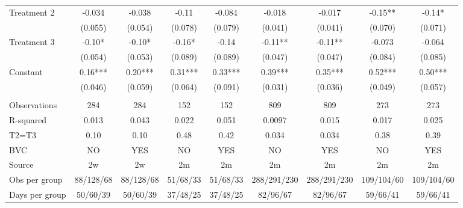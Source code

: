 \begin{tabular}{lcccccccc}
\midrule
\midrule
Treatment 2 & -0.034 & -0.038 & -0.11 & -0.084 & -0.018 & -0.017 & -0.15** & -0.14* \\
      & (0.055) & (0.054) & (0.078) & (0.079) & (0.041) & (0.041) & (0.070) & (0.071) \\
Treatment 3 & -0.10* & -0.10* & -0.16* & -0.14 & -0.11** & -0.11** & -0.073 & -0.064 \\
      & (0.054) & (0.053) & (0.089) & (0.089) & (0.047) & (0.047) & (0.084) & (0.085) \\
Constant  & 0.16*** & 0.20*** & 0.31*** & 0.33*** & 0.39*** & 0.35*** & 0.52*** & 0.50*** \\
      & (0.046) & (0.059) & (0.064) & (0.091) & (0.031) & (0.036) & (0.049) & (0.057) \\
      &       &       &       &       &       &       &       &  \\
Observations & 284   & 284   & 152   & 152   & 809   & 809   & 273   & 273 \\
R-squared & 0.013 & 0.043 & 0.022 & 0.051 & 0.0097 & 0.015 & 0.017 & 0.025 \\
T2=T3 & 0.10  & 0.10  & 0.48  & 0.42  & 0.034 & 0.034 & 0.38  & 0.39 \\
BVC   & NO    & YES   & NO    & YES   & NO    & YES   & NO    & YES \\
Source & 2w    & 2w    & 2m    & 2m    & 2m    & 2m    & 2m    & 2m \\
Obs per group & 88/128/68 & 88/128/68 & 51/68/33 & 51/68/33 & 288/291/230 & 288/291/230 & 109/104/60 & 109/104/60 \\
Days per group & 50/60/39 & 50/60/39 & 37/48/25 & 37/48/25 & 82/96/67 & 82/96/67 & 59/66/41 & 59/66/41 \\
\bottomrule
\bottomrule
\end{tabular}%
